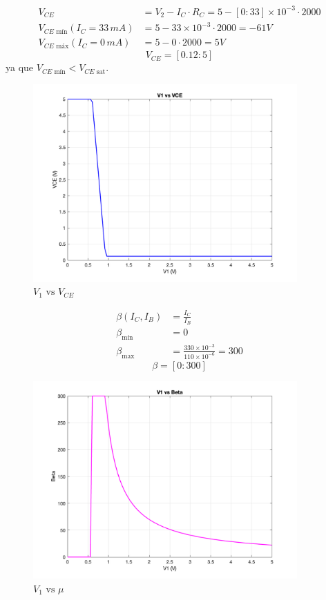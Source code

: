 \documentclass[a4paper]{article}
\begin{document}
\begin{align}
V_{CE} & =V_{2}-I_{C}\cdot R_{C}=5-[0:33]\times 10^{-3}\cdot 2000 \\ 
V_{CE\text{ mín}}(I_{C}=33\,mA ) & =5-33\times 10^{-3}\cdot 2000=-61V \\
V_{CE\text{ máx}}(I_{C}=0\,mA) & =5-0\cdot 2000=5V
\end{align}
$$
\boxed{V_{CE}=[0.12:5]}
$$
ya que $V_{CE\text{ mín}}<V_{CE\text{ sat}}$.
\begin{figure}[H]
    \centering
    \includegraphics[width=0.9\textwidth]{IMG/bjt_1.png}
    \caption{$V_1\text{ vs }V_{CE}$}
    \label{fig:bjt_1}
\end{figure}

\newpage

\begin{align}
    \beta(I_C,I_B) &= \frac{I_C}{I_B} \\
    \beta_{\text{mín}}  &= 0 \\
    \beta_{\text{max}} &= \frac{330\times10^{-3}}{110\times10^{-6}}=300
\end{align}
$$
\boxed{\beta = [0:300]}
$$
\begin{figure}[H]
    \centering
    \includegraphics[width=0.9\textwidth]{IMG/bjt_4.png}
    \caption{$V_1\text{ vs }\mu$}
    \label{fig:bjt_4}
\end{figure}
\end{document}
